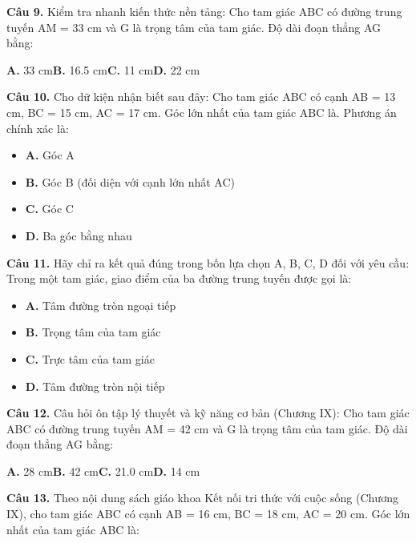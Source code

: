 \documentclass[11pt,a4paper]{article}
\begin{document}
\textbf{\color{primary} Câu 9.} Kiểm tra nhanh kiến thức nền tảng: Cho tam giác ABC có đường trung tuyến AM = 33 cm và G là trọng tâm của tam giác. Độ dài đoạn thẳng AG bằng:\par
\hspace*{1.5em}\textbf{A.} 33 cm\quad\quad \textbf{B.} 16.5 cm\quad\quad \textbf{C.} 11 cm\quad\quad \textbf{D.} 22 cm\par\vspace{2pt}
\textbf{\color{primary} Câu 10.} Cho dữ kiện nhận biết sau đây: Cho tam giác ABC có cạnh AB = 13 cm, BC = 15 cm, AC = 17 cm. Góc lớn nhất của tam giác ABC là. Phương án chính xác là:\par
\begin{itemize}\setlength{\itemsep}{1pt}\setlength{\parskip}{0pt}
  \item[] \textbf{A.} Góc A
  \item[] \textbf{B.} Góc B (đối diện với cạnh lớn nhất AC)
  \item[] \textbf{C.} Góc C
  \item[] \textbf{D.} Ba góc bằng nhau
\end{itemize}\vspace{2pt}
\textbf{\color{primary} Câu 11.} Hãy chỉ ra kết quả đúng trong bốn lựa chọn A, B, C, D đối với yêu cầu: Trong một tam giác, giao điểm của ba đường trung tuyến được gọi là:\par
\begin{itemize}\setlength{\itemsep}{1pt}\setlength{\parskip}{0pt}
  \item[] \textbf{A.} Tâm đường tròn ngoại tiếp
  \item[] \textbf{B.} Trọng tâm của tam giác
  \item[] \textbf{C.} Trực tâm của tam giác
  \item[] \textbf{D.} Tâm đường tròn nội tiếp
\end{itemize}\vspace{2pt}
\textbf{\color{primary} Câu 12.} Câu hỏi ôn tập lý thuyết và kỹ năng cơ bản (Chương IX): Cho tam giác ABC có đường trung tuyến AM = 42 cm và G là trọng tâm của tam giác. Độ dài đoạn thẳng AG bằng:\par
\hspace*{1.5em}\textbf{A.} 28 cm\quad\quad \textbf{B.} 42 cm\quad\quad \textbf{C.} 21.0 cm\quad\quad \textbf{D.} 14 cm\par\vspace{2pt}
\textbf{\color{primary} Câu 13.} Theo nội dung sách giáo khoa Kết nối tri thức với cuộc sống (Chương IX), cho tam giác ABC có cạnh AB = 16 cm, BC = 18 cm, AC = 20 cm. Góc lớn nhất của tam giác ABC là:\par
\end{document}
